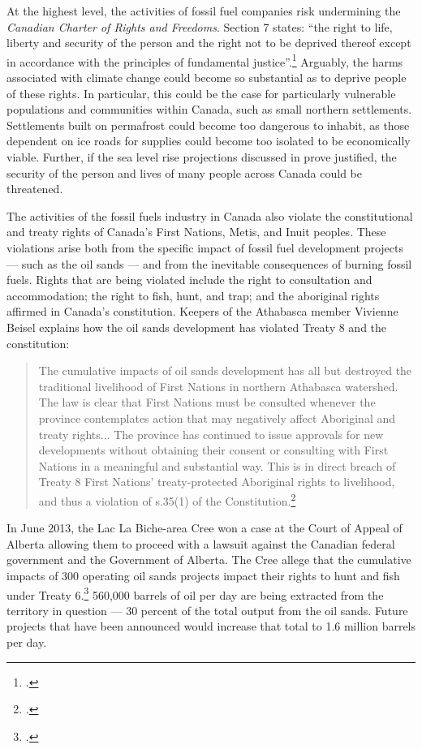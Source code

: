 \documentclass[10pt]{article}
\begin{document}
At the highest level, the activities of fossil fuel companies risk undermining the \emph{Canadian Charter of Rights and Freedoms}.  
Section 7 states: ``the right to life, liberty and security of the person and the right not to be deprived thereof except in accordance with the principles of fundamental justice''.\footcite[][]{CharterRF}
Arguably, the harms associated with climate change could become so substantial as to deprive people of these rights.
In particular, this could be the case for particularly vulnerable populations and communities within Canada, such as small northern settlements.
Settlements built on permafrost could become too dangerous to inhabit, as those dependent on ice roads for supplies could become too isolated to be economically viable.
Further, if the sea level rise projections discussed in  prove justified, the security of the person and lives of many people across Canada could be threatened.



The activities of the fossil fuels industry in Canada also violate the constitutional and treaty rights of Canada's First Nations, Metis, and Inuit peoples.
These violations arise both from the specific impact of fossil fuel development projects --- such as the oil sands --- and from the inevitable consequences of burning fossil fuels.
Rights that are being violated include the right to consultation and accommodation; the right to fish, hunt, and trap; and the aboriginal rights affirmed in Canada's constitution.
Keepers of the Athabasca member Vivienne Beisel explains how the oil sands development has violated Treaty 8 and the constitution:
\begin{quote}
The cumulative impacts of oil sands development has all but destroyed the traditional livelihood of First Nations in northern Athabasca watershed. The law is clear that First Nations must be consulted whenever the province contemplates action that may negatively affect Aboriginal and treaty rights... The province has continued to issue approvals for new developments without obtaining their consent or consulting with First Nations in a meaningful and substantial way. This is in direct breach of Treaty 8 First Nations' treaty-protected Aboriginal rights to livelihood, and thus a violation of s.35(1) of the Constitution.\footcite[][]{PassingNoNewOilSandsApprovalsResolution}
\end{quote}
In June 2013, the Lac La Biche-area Cree won a case at the Court of Appeal of Alberta allowing them to proceed with a lawsuit against the Canadian federal government and the Government of Alberta.
The Cree allege that the cumulative impacts of 300 operating oil sands projects impact their rights to hunt and fish under Treaty 6.\footcite[][]{BandWinsTreatyRights}
560,000 barrels of oil per day are being extracted from the territory in question --- 30 percent of the total output from the oil sands.
Future projects that have been announced would increase that total to 1.6 million barrels per day.
\end{document}

